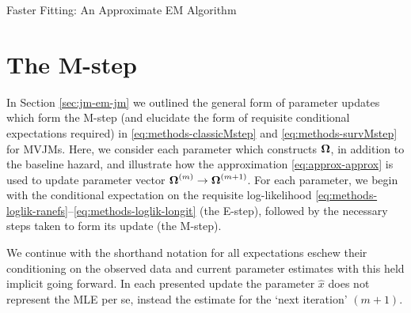 \begin{chapter}{\label{cha:approx}Faster Fitting: An Approximate EM Algorithm}
  \section{The M-step}\label{sec:approx-Mstep}
  In Section \ref{sec:jm-em-jm} we outlined the general form of parameter updates which form the M-step (and elucidate the form of requisite conditional expectations required) in \eqref{eq:methods-classicMstep} and \eqref{eq:methods-survMstep} for MVJMs. Here, we consider each parameter which constructs $\bm{\mathrm{\Omega}}$, in addition to the baseline hazard, and illustrate how the approximation \eqref{eq:approx-approx} is used to update parameter vector $\bm{\mathrm{\Omega}}^{(m)}\rightarrow\bm{\mathrm{\Omega}}^{(m+1)}$. For each parameter, we begin with the conditional expectation on the requisite log-likelihood \eqref{eq:methods-loglik-ranefs}--\eqref{eq:methods-loglik-longit} (\ie the E-step), followed by the necessary steps taken to form its update (\ie the M-step). 
  
  We continue with the shorthand notation for all expectations \ie eschew their conditioning on the observed data and current parameter estimates with this held implicit going forward. In each presented update the parameter $\hat{x}$ does not represent the MLE per se, instead the estimate for the `next iteration' $(m+1)$.

\end{chapter}
